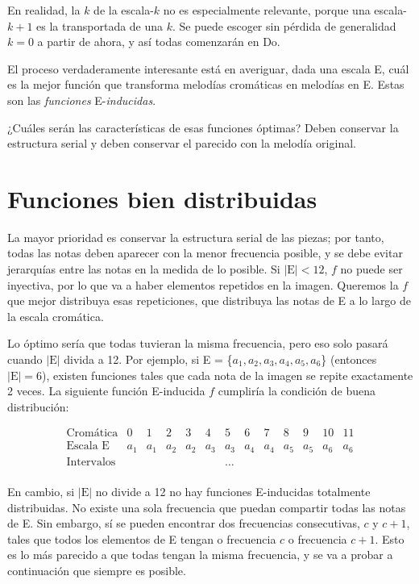 		En realidad, la $k$ de la escala-$k$ no es especialmente relevante, porque una escala-$k+1$ es la transportada de una $k$. Se puede escoger sin pérdida de generalidad $k=0$ a partir de ahora, y así todas comenzarán en Do.
		
		El proceso verdaderamente interesante está en averiguar, dada una escala E, cuál es la mejor función que transforma melodías cromáticas en melodías en E. Estas son las \textit{funciones} E-\textit{inducidas}.
		
		¿Cuáles serán las características de esas funciones óptimas? Deben conservar la estructura serial y deben conservar el parecido con la melodía original.
		
	\section{Funciones bien distribuidas}
		
		La mayor prioridad es conservar la estructura serial de las piezas; por tanto, todas las notas deben aparecer con la menor frecuencia posible, y se debe evitar jerarquías entre las notas en la medida de lo posible. Si $|\text{E}|<12$, $f$ no puede ser inyectiva, por lo que va a haber elementos repetidos en la imagen. Queremos la $f$ que mejor distribuya esas repeticiones, que distribuya las notas de E a lo largo de la escala cromática.
		
		Lo óptimo sería que todas tuvieran la misma frecuencia, pero eso solo pasará cuando $|\text{E}|$ divida a 12. Por ejemplo, si E = \{$a_1,a_2,a_3,a_4,a_5,a_6$\} (entonces $|\text{E}|=6$), existen funciones tales que cada nota de la imagen se repite exactamente 2 veces. La siguiente función E-inducida $f$ cumpliría la condición de buena distribución:
				
		\[\left.\begin{matrix}
		\text{Cromática}&0&1&2&3&4&5&6&7&8&9&10&11\\
		\text{Escala E}&a_1&a_1&a_2&a_2&a_3&a_3&a_4&a_4&a_5&a_5&a_6&a_6\\
		\text{Intervalos}&&&&&&\ldots\\
		\end{matrix}\right.\]
		
		En cambio, si $|\text{E}|$ no divide a 12 no hay funciones E-inducidas totalmente distribuidas. No existe una sola frecuencia que puedan compartir todas las notas de E. Sin embargo, sí se pueden encontrar dos frecuencias consecutivas, $c$ y $c+1$, tales que todos los elementos de E tengan o frecuencia $c$ o frecuencia $c+1$. Esto es lo más parecido a que todas tengan la misma frecuencia, y se va a probar a continuación que siempre es posible. 
		
